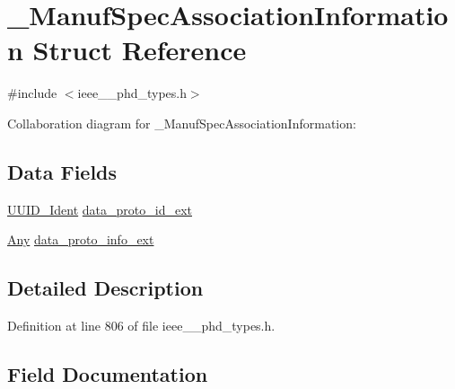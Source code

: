 \hypertarget{struct___manuf_spec_association_information}{}\section{\+\_\+\+Manuf\+Spec\+Association\+Information Struct Reference}
\label{struct___manuf_spec_association_information}


{\ttfamily \#include $<$ieee\+\_\+\_\+phd\+\_\+types.\+h$>$}



Collaboration diagram for \+\_\+\+Manuf\+Spec\+Association\+Information\+:
\subsection*{Data Fields}
\begin{DoxyCompactItemize}
\item 
\hyperlink{ieee__11073__phd__types_8h_a1fb78775dbce28bb08c4761714e4dd15}{U\+U\+I\+D\+\_\+\+Ident} \hyperlink{struct___manuf_spec_association_information_a3d495ceace748877faecd0ecd1a20585}{data\+\_\+proto\+\_\+id\+\_\+ext}
\item 
\hyperlink{ieee__11073__phd__types_8h_a4decf91c0c44a2ed84549e41307f5fdb}{Any} \hyperlink{struct___manuf_spec_association_information_afb4220c386e9c19c3a73671c656a5e1f}{data\+\_\+proto\+\_\+info\+\_\+ext}
\end{DoxyCompactItemize}


\subsection{Detailed Description}


Definition at line 806 of file ieee\+\_\+\_\+phd\+\_\+types.\+h.



\subsection{Field Documentation}
\hypertarget{struct___manuf_spec_association_information_a3d495ceace748877faecd0ecd1a20585}{}
